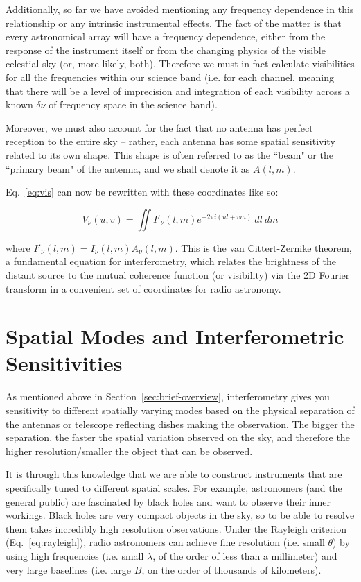 Additionally, so far we have avoided mentioning any frequency dependence in 
this relationship or any intrinsic instrumental effects. The fact of the matter 
is that every astronomical array will have a frequency dependence, either from 
the response of the instrument itself or from the changing physics of the 
visible celestial sky (or, more likely, both). Therefore we must in fact 
calculate visibilities for all the frequencies within our science band (i.e.  
for each channel, meaning that there will be a level of imprecision and 
integration of each visibility across a known $\delta \nu$ of frequency space 
in the science band).

Moreover, we must also account for the fact that no antenna has perfect 
reception to the entire sky -- rather, each antenna has some spatial 
sensitivity related to its own shape. This shape is often referred to as the 
``beam" or the ``primary beam" of the antenna, and we shall denote it as 
$A(l,m)$. 

Eq.~\eqref{eq:vis} can now be rewritten with these coordinates like so:

\begin{equation}
    V_\nu(u,v) = \iint I'_\nu(l,m) e^{-2\pi i (ul + vm)} ~dl ~dm
    \label{eq:van-cittert}
\end{equation}

\noindent where $I'_\nu(l,m) = I_\nu(l,m) A_\nu(l,m)$. This is the van 
Cittert-Zernike theorem, a fundamental equation for interferometry, which 
relates the brightness of the distant source to the mutual coherence function 
(or visibility) via the 2D Fourier transform in a convenient set of coordinates 
for radio astronomy.

\section{Spatial Modes and Interferometric Sensitivities}

As mentioned above in Section~\ref{sec:brief-overview}, interferometry gives 
you sensitivity to different spatially varying modes based on the physical 
separation of the antennas or telescope reflecting dishes making the 
observation. The bigger the separation, the faster the spatial variation 
observed on the sky, and therefore the higher resolution/smaller the object 
that can be observed.

It is through this knowledge that we are able to construct instruments that are 
specifically tuned to different spatial scales. For example, astronomers (and 
the general public) are fascinated by black holes and want to observe their 
inner workings. Black holes are very compact objects in the sky, so to be able 
to resolve them takes incredibly high resolution observations. Under the 
Rayleigh criterion (Eq.~\ref{eq:rayleigh}), radio astronomers can achieve fine 
resolution (i.e. small $\theta$)  by using high frequencies (i.e.  small 
$\lambda$, of the order of less than a millimeter) and very large baselines 
(i.e.  large $B$, on the order of thousands of kilometers).

